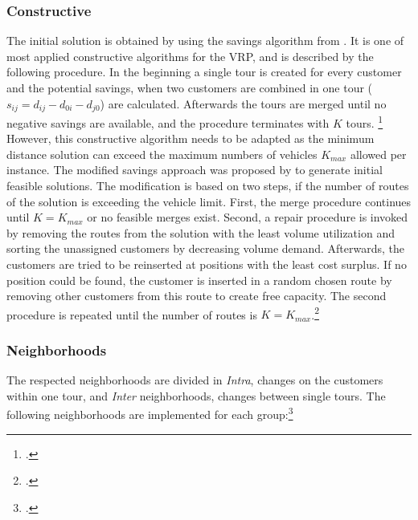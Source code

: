 \subsubsection{Constructive}
The initial solution is obtained by using the savings algorithm from \cite{clarke_scheduling_1964}. It is one of
most applied constructive algorithms for the \gls{VRP}, and is described by the following procedure. In the beginning
a single tour is created for every customer and the potential savings, when two customers are combined in one tour
($s_{ij} = d_{ij} - d_{0i} - d_{j0}$) are calculated.
Afterwards the tours are merged until no negative savings are available, and the
procedure terminates with $K$ tours. \footcite[cf.][]{clarke_scheduling_1964} However, this constructive algorithm needs to be adapted
as the minimum distance solution can exceed the maximum numbers of vehicles $K_{max}$ allowed per instance.
The modified savings approach was proposed by \cite{zhang_evolutionary_2015} to generate initial feasible solutions.
The modification is based on two steps, if the number of routes of the solution is exceeding the vehicle limit. First,
the merge procedure continues until $K = K_{max}$ or no feasible merges exist. Second, a repair procedure is invoked
by removing the routes from the solution with the least volume utilization and sorting the unassigned customers by
decreasing volume demand. Afterwards, the customers are tried to be reinserted at positions with the least
cost surplus. If no position could be found, the customer is inserted in a random chosen route by removing
other customers from this route to create free capacity. The second procedure is repeated until the
number of routes is $K = K_{max}$.\footcite[cf.][p.24]{zhang_evolutionary_2015}

\subsubsection{Neighborhoods}
\label{sec:neighborhoods}

The respected neighborhoods are divided in \textit{Intra}, changes on the customers within one tour, and \textit{Inter} neighborhoods,
changes between single tours. The following neighborhoods are implemented for each group:\footcite[cf.][pp. 89-90]{toth_vehicle_2014}

